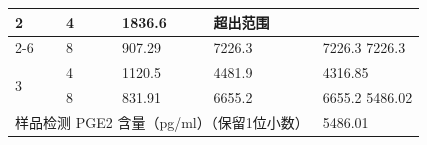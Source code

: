 \documentclass[UTF8,10pt,a4paper,fontset=fandol]{ctexart}
\newcommand{\fieldvalue}[1]{#1}
\newcommand{\handwritten}[1]{#1}
\begin{document}
\begin{tabularx}{\textwidth}{|p{}|p{}|p{}|p{}|p{}|X|}
\hline
\multirow{2}{*}{2} &
\fieldvalue{\handwritten{4}} &
&
\fieldvalue{\handwritten{1836.6}} &
\fieldvalue{\handwritten{超出范围}} &
\\
\cline{2-6}
&
\fieldvalue{\handwritten{8}} &
&
\fieldvalue{\handwritten{907.29}} &
\fieldvalue{\handwritten{7226.3}} &
\fieldvalue{\handwritten{7226.3}} \quad
\fieldvalue{\handwritten{7226.3}}\\
\hline
\multirow{2}{*}{3} &
\fieldvalue{\handwritten{4}} &
&
\fieldvalue{\handwritten{1120.5}} &
\fieldvalue{\handwritten{4481.9}} &
\fieldvalue{\handwritten{4316.85}}\\
\cline{2-6}
&
\fieldvalue{\handwritten{8}} &
&
\fieldvalue{\handwritten{831.91}} &
\fieldvalue{\handwritten{6655.2}} &
\fieldvalue{\handwritten{6655.2}} \quad
\fieldvalue{\handwritten{5486.02}}\\
\hline
\multicolumn{5}{|l|}{样品检测 PGE2 含量（pg/ml）（保留1位小数）} &
\fieldvalue{\handwritten{5486.01}}\\
\hline
\end{tabularx}
\end{document}
